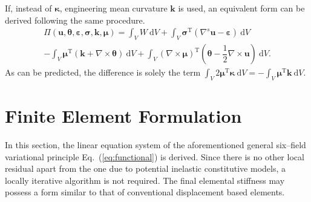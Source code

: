 \documentclass[3p,sort&compress,11pt,fleqn]{elsarticle}
\newcommand*{\eqsref}[1]{Eq.~(\ref{#1})}
\newcommand*{\mT}{\mathrm{T}}
\newcommand*{\md}[1]{\mathrm{d}#1}
\begin{document}
If, instead of $\mathbold{\kappa}$, engineering mean curvature $\mathbold{k}$ is used, an equivalent form can be derived following the same procedure.
\begin{multline}\label{eq:functional2}
\varPi\left(\mathbold{u},\mathbold{\theta},\mathbold{\varepsilon},\mathbold{\sigma},\mathbold{k},\mathbold{\mu}\right)=\int_VW~\md{V}
+\int_V\mathbold{\sigma}^\mT\left(\nabla^s\mathbold{u}-\mathbold{\varepsilon}\right)~\md{V}\\
-\int_V\mathbold{\mu}^\mT\left(\mathbold{k}+\nabla\times\mathbold{\theta}\right)~\md{V}
+\int_V\left(\nabla\times\mathbold{\mu}\right)^\mT\left(\mathbold{\theta}-\dfrac{1}{2}\nabla\times\mathbold{u}\right)~\md{V}.
\end{multline}
As can be predicted, the difference is solely the term $\displaystyle\int_V2\mathbold{\mu}^\mT\mathbold{\kappa}~\md{V}=-\int_V\mathbold{\mu}^\mT\mathbold{k}~\md{V}$.
\section{Finite Element Formulation}
In this section, the linear equation system of the aforementioned general six--field variational principle \eqsref{eq:functional} is derived. Since there is no other local residual apart from the one due to potential inelastic constitutive models, a locally iterative algorithm is not required. The final elemental stiffness may possess a form similar to that of conventional displacement based elements.
\end{document}
